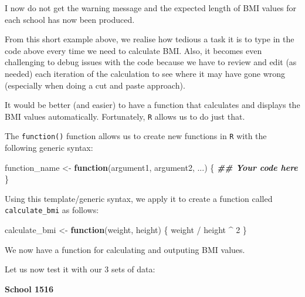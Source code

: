 \documentclass[
  12pt,
]{book}
\newenvironment{Shaded}{\begin{snugshade}}{\end{snugshade}}
\newcommand{\AttributeTok}[1]{\textcolor[rgb]{0.77,0.63,0.00}{#1}}
\newcommand{\ControlFlowTok}[1]{\textcolor[rgb]{0.13,0.29,0.53}{\textbf{#1}}}
\newcommand{\DecValTok}[1]{\textcolor[rgb]{0.00,0.00,0.81}{#1}}
\newcommand{\DocumentationTok}[1]{\textcolor[rgb]{0.56,0.35,0.01}{\textbf{\textit{#1}}}}
\newcommand{\FunctionTok}[1]{\textcolor[rgb]{0.00,0.00,0.00}{#1}}
\newcommand{\NormalTok}[1]{#1}
\newcommand{\OtherTok}[1]{\textcolor[rgb]{0.56,0.35,0.01}{#1}}
\newcommand{\SpecialCharTok}[1]{\textcolor[rgb]{0.00,0.00,0.00}{#1}}
\begin{document}
I now do not get the warning message and the expected length of BMI values for each school has now been produced.

From this short example above, we realise how tedious a task it is to type in the code above every time we need to calculate BMI. Also, it becomes even challenging to debug issues with the code because we have to review and edit (as needed) each iteration of the calculation to see where it may have gone wrong (especially when doing a cut and paste approach).

It would be better (and easier) to have a function that calculates and displays the BMI values automatically. Fortunately, \texttt{R} allows us to do just that.

The \texttt{function()} function allows us to create new functions in \texttt{R} with the following generic syntax:

\begin{Shaded}
\begin{Highlighting}[]
\NormalTok{function\_name }\OtherTok{\textless{}{-}} \ControlFlowTok{function}\NormalTok{(argument1, argument2, ...) \{}
  \DocumentationTok{\#\# Your code here}
\NormalTok{\}}
\end{Highlighting}
\end{Shaded}

Using this template/generic syntax, we apply it to create a function called \texttt{calculate\_bmi} as follows:

\begin{Shaded}
\begin{Highlighting}[]
\NormalTok{calculate\_bmi }\OtherTok{\textless{}{-}} \ControlFlowTok{function}\NormalTok{(weight, height) \{}
\NormalTok{  weight }\SpecialCharTok{/}\NormalTok{ height }\SpecialCharTok{\^{}} \DecValTok{2}
\NormalTok{\}}
\end{Highlighting}
\end{Shaded}

We now have a function for calculating and outputing BMI values.

Let us now test it with our 3 sets of data:

\textbf{School 1516}

\begin{Shaded}
\end{Shaded}
\end{document}
